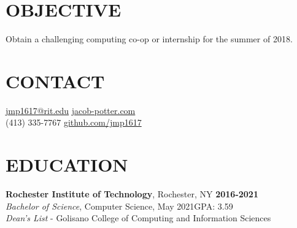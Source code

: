 \documentclass[line,margin]{res}
\begin{document}

\begin{resume}

\section{OBJECTIVE}
Obtain a challenging computing co-op or internship for the summer of 2018.

\section{CONTACT}
\href{mailto:jmp1617@rit.edu}{jmp1617@rit.edu}\hfill 
\href{https://jacob-potter.com}{jacob-potter.com}\\
(413) 335-7767\hfill 
\href{https://github.com/jmp1617}{github.com/jmp1617}

\section{EDUCATION}
\textbf{Rochester Institute of Technology}, Rochester, NY\hfill
    \textbf{2016-2021}\\
{\sl Bachelor of Science}, Computer Science, May 2021\hfill GPA: 3.59
\\
{\sl Dean's List} - Golisano College of Computing and Information Sciences


\end{resume}
\end{document}
